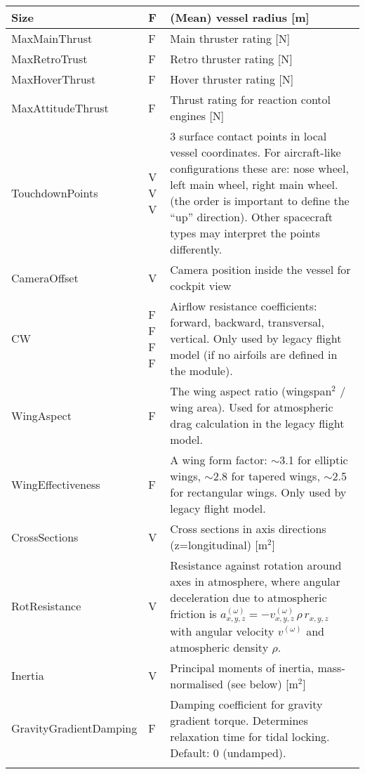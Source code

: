 \documentclass[Orbiter Developer Manual.tex]{subfiles}
\begin{document}
\begin{longtable}{ |p{}|p{}|p{}| }
	\hline\rule{0pt}{2ex}
	Size & F & (Mean) vessel radius [m]\\
	\hline\rule{0pt}{2ex}
	MaxMainThrust & F & Main thruster rating [N]\\
	\hline\rule{0pt}{2ex}
	MaxRetroTrust & F & Retro thruster rating [N]\\
	\hline\rule{0pt}{2ex}
	MaxHoverThrust & F & Hover thruster rating [N]\\
	\hline\rule{0pt}{2ex}
	MaxAttitudeThrust & F & Thrust rating for reaction contol engines [N]\\
	\hline\rule{0pt}{2ex}
	TouchdownPoints & V V V & 3 surface contact points in local vessel coordinates. For aircraft-like configurations these are: nose wheel, left main wheel, right main wheel. (the order is important to define the “up” direction). Other spacecraft types may interpret the points differently.\\
	\hline\rule{0pt}{2ex}
	CameraOffset & V & Camera position inside the vessel for cockpit view\\
	\hline\rule{0pt}{2ex}
	CW & F F F F & Airflow resistance coefficients: forward, backward, transversal, vertical. Only used by legacy flight model (if no airfoils are defined in the module).\\
	\hline\rule{0pt}{2ex}
	WingAspect & F & The wing aspect ratio (wingspan$^{2}$ / wing area). Used for atmospheric drag calculation in the legacy flight model.\\
	\hline\rule{0pt}{2ex}
	WingEffectiveness & F & A wing form factor: $\sim$3.1 for elliptic wings, $\sim$2.8 for tapered wings, $\sim$2.5 for rectangular wings. Only used by legacy flight model.\\
	\hline\rule{0pt}{2ex}
	CrossSections & V & Cross sections in axis directions (z=longitudinal) [m$^{2}$]\\
	\hline\rule{0pt}{2ex}
	RotResistance & V & Resistance against rotation around axes in atmosphere, where angular deceleration due to atmospheric friction is $a_{x,y,z}^{(\omega)} = -v_{x,y,z}^{(\omega)} \, \rho \, r_{x,y,z}$ with angular velocity $v^{(\omega)}$ and atmospheric density $\rho$.\\
	\hline\rule{0pt}{2ex}
	Inertia & V & Principal moments of inertia, mass-normalised (see below) [m$^{2}$]\\
	\hline\rule{0pt}{2ex}
	GravityGradientDamping & F & Damping coefficient for gravity gradient torque. Determines relaxation time for tidal locking. Default: 0 (undamped).\\
	\hline\rule{0pt}{2ex}

\end{longtable}
\end{document}
